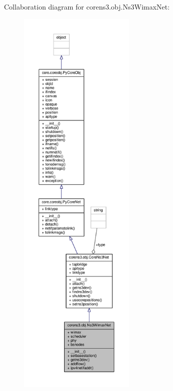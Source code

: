 Collaboration diagram for corens3.\+obj.\+Ns3\+Wimax\+Net\+:
\nopagebreak
\begin{figure}[H]
\begin{center}
\leavevmode
\includegraphics[height=550pt]{classcorens3_1_1obj_1_1_ns3_wimax_net__coll__graph}
\end{center}
\end{figure}
